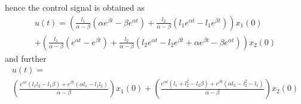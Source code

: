 hence the control signal is obtained as
\begin{equation}
\begin{split}
    u(t)=\left(\frac{l_1}{\alpha-\beta}
    (\alpha e^{\beta t}-\beta e^{\alpha t})+\frac{l_2}{\alpha-\beta}
    (l_1e^{\alpha t}-l_1e^{\beta t})\right)x_1(0)\\
    +\left(\frac{l_1}{\alpha-\beta}(e^{\alpha t}- e^{\beta t})
    +\frac{l_2}{\alpha-\beta}(l_2e^{\alpha t}-l_2e^{\beta t}+\alpha e^{\beta t}-\beta e^{\alpha t})\right)x_2(0)
\end{split}
\end{equation}
and further
\begin{equation}
    \begin{split}
        u(t)=\\
        \left(\frac{e^{\alpha t}(l_1l_2-l_1\beta)+e^{\beta t}(\alpha l_1-l_1l_2)}{\alpha-\beta}\right)x_1(0)
        +\left(\frac{e^{\alpha t}(l_1+l_2^2-l_2\beta)+e^{\beta t}(\alpha l_2-l_2^2-l_1)}{\alpha-\beta}
        \right)x_2(0)
    \end{split}
\end{equation}
